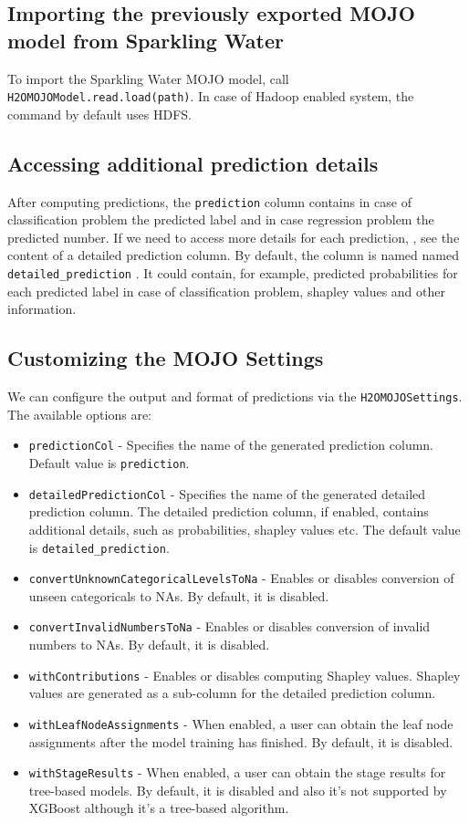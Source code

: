 \subsection{Importing the previously exported MOJO model from Sparkling Water}

To import the Sparkling Water MOJO model, call\\ \texttt{H2OMOJOModel.read.load(path)}. In case of Hadoop enabled system, the command by default
uses HDFS.

\subsection{Accessing additional prediction details}

After computing predictions, the \texttt{prediction} column contains in case of classification problem the predicted label
and in case regression problem the predicted number. If we need to access more details for each prediction, , see the content
of a detailed prediction column. By default, the column is named named \texttt{detailed\_prediction} . It could contain, for example,
predicted probabilities for each predicted label in case of classification problem, shapley values and other information.

\subsection{Customizing the MOJO Settings}

We can configure the output and format of predictions via the \texttt{H2OMOJOSettings}. The available options are:

\begin{itemize}
    \item \texttt{predictionCol} - Specifies the name of the generated prediction column. Default value is \texttt{prediction}.
    \item \texttt{detailedPredictionCol} - Specifies the name of the generated detailed prediction column. The detailed prediction column, if enabled, contains additional details, such as probabilities, shapley values etc. The default value is \texttt{detailed\_prediction}.
    \item \texttt{convertUnknownCategoricalLevelsToNa} - Enables or disables conversion of unseen categoricals to NAs. By default, it is disabled.
    \item \texttt{convertInvalidNumbersToNa} - Enables or disables conversion of invalid numbers to NAs. By default, it is disabled.
    \item \texttt{withContributions} - Enables or disables computing Shapley values. Shapley values are generated as a sub-column for the detailed prediction column.
    \item \texttt{withLeafNodeAssignments} - When enabled, a user can obtain the leaf node assignments after the model training has finished. By default, it is disabled.
    \item \texttt{withStageResults} - When enabled, a user can obtain the stage results for tree-based models. By default, it is disabled and also it's not supported by XGBoost although it's a tree-based algorithm.
\end{itemize}

